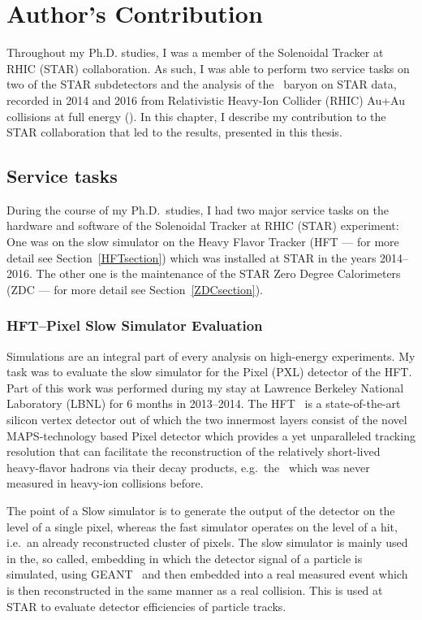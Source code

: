 \chapter*{Author's Contribution}
Throughout my Ph.D. studies, I was a member of the Solenoidal Tracker at RHIC (STAR) collaboration. As such, I was able to perform two service tasks on two of the STAR subdetectors and the analysis of the \Lambdac\ baryon on STAR data, recorded in 2014 and 2016 from Relativistic Heavy-Ion Collider (RHIC) Au+Au collisions at full energy (\snnFull)\@. In this chapter, I describe my contribution to the STAR collaboration that led to the results, presented in this thesis.


\section*{Service tasks}
During the course of my Ph.D.\ studies, I had two major service tasks on the hardware and software of the Solenoidal Tracker at RHIC (STAR) experiment: One was on the slow simulator on the Heavy Flavor Tracker (HFT --- for more detail see Section~\ref{HFTsection}) which was installed at STAR in the years 2014--2016.  The other one is the maintenance of the STAR Zero Degree Calorimeters (ZDC --- for more detail see Section~\ref{ZDCsection}).

\subsection*{HFT--Pixel Slow Simulator Evaluation}
Simulations are an integral part of every analysis on high-energy experiments. My task was to evaluate the slow simulator for the Pixel (PXL) detector of the HFT\@. Part of this work was performed during my stay at Lawrence Berkeley National Laboratory (LBNL) for 6 months in 2013--2014\@. The HFT~\cite{HFTLeo, HftFinal, HftTdr} is a state-of-the-art silicon vertex detector out of which the two innermost layers consist of the novel MAPS-technology based Pixel detector which provides a yet unparalleled tracking resolution that can facilitate the reconstruction of the relatively short-lived heavy-flavor hadrons via their decay products, e.g.\ the \Lambdac\ which was never measured in heavy-ion collisions before.

The point of a Slow simulator is to generate the output of the detector on the level of a single pixel, whereas the fast simulator operates on the level of a hit, i.e.\ an already reconstructed cluster of pixels. The slow simulator is mainly used in the, so called, embedding in which the detector signal of a particle is simulated, using GEANT~\cite{GEANT} and then embedded into a real measured event which is then reconstructed in the same manner as a real collision.
This is used at STAR to evaluate detector efficiencies of particle tracks.



